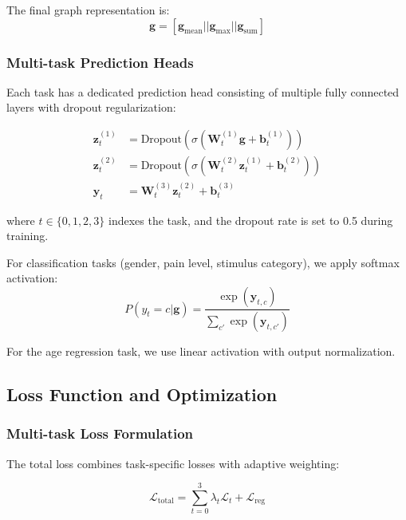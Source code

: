 \documentclass[10pt,journal,compsoc]{IEEEtran}
\begin{document}
The final graph representation is:
\begin{equation}
\mathbf{g} = [\mathbf{g}_{\text{mean}} || \mathbf{g}_{\text{max}} || \mathbf{g}_{\text{sum}}]
\end{equation}

\subsubsection{Multi-task Prediction Heads}

Each task has a dedicated prediction head consisting of multiple fully connected layers with dropout regularization:

\begin{align}
\mathbf{z}_t^{(1)} &= \text{Dropout}(\sigma(\mathbf{W}_t^{(1)} \mathbf{g} + \mathbf{b}_t^{(1)})) \\
\mathbf{z}_t^{(2)} &= \text{Dropout}(\sigma(\mathbf{W}_t^{(2)} \mathbf{z}_t^{(1)} + \mathbf{b}_t^{(2)})) \\
\mathbf{y}_t &= \mathbf{W}_t^{(3)} \mathbf{z}_t^{(2)} + \mathbf{b}_t^{(3)}
\end{align}

where $t \in \{0, 1, 2, 3\}$ indexes the task, and the dropout rate is set to 0.5 during training.

For classification tasks (gender, pain level, stimulus category), we apply softmax activation:
\begin{equation}
P(y_t = c | \mathbf{g}) = \frac{\exp(\mathbf{y}_{t,c})}{\sum_{c'} \exp(\mathbf{y}_{t,c'})}
\end{equation}

For the age regression task, we use linear activation with output normalization.

\subsection{Loss Function and Optimization}

\subsubsection{Multi-task Loss Formulation}

The total loss combines task-specific losses with adaptive weighting:

\begin{equation}
\mathcal{L}_{\text{total}} = \sum_{t=0}^{3} \lambda_t \mathcal{L}_t + \mathcal{L}_{\text{reg}}
\end{equation}
\end{document}
